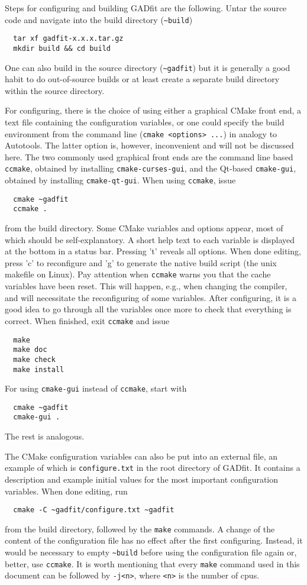 \documentclass{article}
\begin{document}
Steps for configuring and building GADfit are the following. Untar the
source code and navigate into the build directory (\verb+~build+)
\begin{verbatim}
  tar xf gadfit-x.x.x.tar.gz
  mkdir build && cd build
\end{verbatim}
One can also build in the source directory (\verb+~gadfit+) but it is
generally a good habit to do out-of-source builds or at least create a
separate build directory within the source directory.

For configuring, there is the choice of using either a graphical CMake
front end, a text file containing the configuration variables, or one
could specify the build environment from the command line
(\verb+cmake <options> ...+) in analogy to Autotools. The latter
option is, however, inconvenient and will not be discussed here. The
two commonly used graphical front ends are the command line based
\texttt{ccmake}, obtained by installing \texttt{cmake-curses-gui}, and
the Qt-based \texttt{cmake-gui}, obtained by installing
\texttt{cmake-qt-gui}. When using \texttt{ccmake}, issue
\begin{verbatim}
  cmake ~gadfit
  ccmake .
\end{verbatim}
from the build directory. Some CMake variables and options appear,
most of which should be self-explanatory. A short help text to each
variable is displayed at the bottom in a status bar. Pressing 't'
reveals all options. When done editing, press 'c' to reconfigure and
'g' to generate the native build script (the unix makefile on
Linux). Pay attention when \texttt{ccmake} warns you that the cache
variables have been reset. This will happen, e.g., when changing the
compiler, and will necessitate the reconfiguring of some
variables. After configuring, it is a good idea to go through all the
variables once more to check that everything is correct. When
finished, exit \texttt{ccmake} and issue
\begin{verbatim}
  make
  make doc
  make check
  make install
\end{verbatim}
For using \texttt{cmake-gui} instead of \texttt{ccmake}, start with
\begin{verbatim}
  cmake ~gadfit
  cmake-gui .
\end{verbatim}
The rest is analogous.

The CMake configuration variables can also be put into an external
file, an example of which is \texttt{configure.txt} in the root
directory of GADfit. It contains a description and example initial
values for the most important configuration variables. When done
editing, run
\begin{verbatim}
  cmake -C ~gadfit/configure.txt ~gadfit
\end{verbatim}
from the build directory, followed by the \texttt{make} commands. A
change of the content of the configuration file has no effect after
the first configuring. Instead, it would be necessary to empty
\verb+~build+ before using the configuration file again or, better,
use \texttt{ccmake}. It is worth mentioning that every \verb+make+
command used in this document can be followed by \verb+-j<n>+, where
\verb+<n>+ is the number of cpus.
\end{document}
